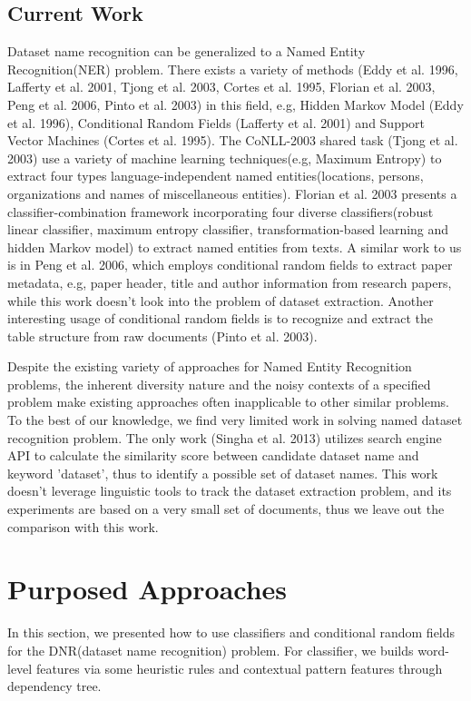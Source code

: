 \documentclass[10pt]{article}
\begin{document}
\subsection{Current Work}
Dataset name recognition can be generalized to a Named Entity Recognition(NER) problem. There exists a variety of methods (Eddy et al. 1996, Lafferty et al. 2001, Tjong et al. 2003, Cortes et al. 1995, Florian et al. 2003, Peng et al. 2006, Pinto et al. 2003) in this field, e.g, Hidden Markov Model (Eddy et al. 1996), Conditional Random Fields (Lafferty et al. 2001) and Support Vector Machines (Cortes et al. 1995). The CoNLL-2003 shared task (Tjong et al. 2003) use a variety of machine learning techniques(e.g, Maximum Entropy) to extract four types language-independent named entities(locations, persons, organizations and names of miscellaneous entities). Florian et al. 2003 presents a classifier-combination framework incorporating four diverse classifiers(robust linear classifier, maximum entropy classifier, transformation-based learning and hidden Markov model) to extract named entities from texts. A similar work to us is in Peng et al. 2006, which employs conditional random fields to extract paper metadata, e.g, paper header, title and author information from research papers, while this work doesn't look into the problem of dataset extraction. Another interesting usage of conditional random fields is to recognize and extract the table structure from raw documents (Pinto et al. 2003).  

Despite the existing variety of approaches for Named Entity Recognition problems, the inherent diversity nature and the noisy contexts of a specified problem make existing approaches often inapplicable to other similar problems. To the best of our knowledge, we find very limited work in solving named dataset recognition problem. The only work (Singha et al. 2013) utilizes search engine API to calculate the similarity score between candidate dataset name and keyword 'dataset', thus to identify a possible set of dataset names. This work doesn't leverage linguistic tools to track the dataset extraction problem, and its experiments are based on a very small set of documents, thus we leave out the comparison with this work. 

\section{Purposed Approaches} 
In this section, we presented how to use classifiers and conditional random fields for the DNR(dataset name recognition) problem. For classifier, we builds word-level features via some heuristic rules and contextual pattern features through dependency tree. 
\end{document}
